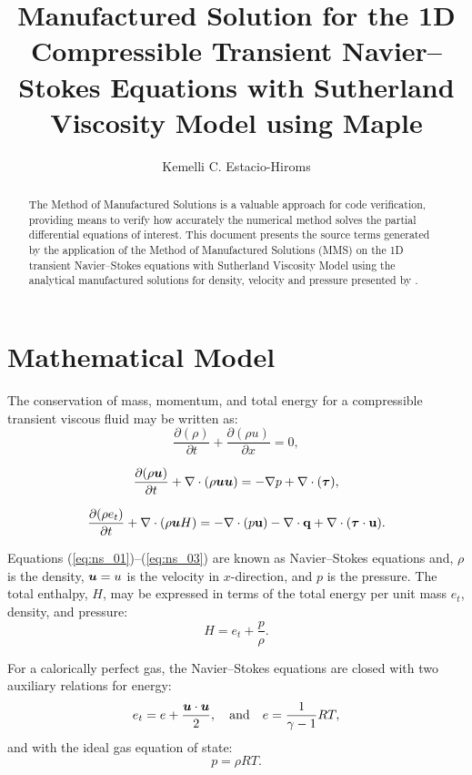 \documentclass[10pt]{article}
\title{Manufactured Solution for the 1D Compressible Transient Navier--Stokes Equations with Sutherland Viscosity Model using Maple\texttrademark}
\author{Kemelli C. Estacio-Hiroms}
\newcommand{\Diff}[2] {\dfrac{\partial( #1)}{\partial #2}}
\newcommand{\bv}[1]{\ensuremath{\mbox{\boldmath$ #1 $}}}
\begin{document}
\maketitle

\begin{abstract}
The Method of Manufactured Solutions is a valuable approach for code verification, providing means to verify how accurately the numerical method solves the partial differential equations of interest.
This document presents the source terms generated by the application of the Method of Manufactured Solutions (MMS) on the 1D transient Navier--Stokes equations  with Sutherland Viscosity Model using the analytical manufactured solutions for density, velocity and pressure presented by \citet{Roy2002}.
\end{abstract}





\section{Mathematical Model}
The conservation of mass, momentum, and total energy for a compressible transient viscous fluid may be written as:
\begin{equation}
 \label{eq:ns_01}
\Diff{\rho}{t} + \Diff{\rho u}{x} = 0,
\end{equation}

\begin{equation}
 \label{eq:ns_02}
\Diff{\rho \bv{u}}{t} +\nabla\cdot\left(\rho\bv{u}\bv{u}\right) = -\nabla p+  \nabla \cdot (\bv{\tau} ),
\end{equation}

\begin{equation}
 \label{eq:ns_03}
\Diff{\rho e_t}{t} +\nabla\cdot\left(\rho \bv{u} H\right) =-   \nabla\cdot(p  \mathbf{u}) -\nabla\cdot \mathbf{q} +  \nabla \cdot (\bv{\tau} \cdot \mathbf{u}).
\end{equation}


Equations (\ref{eq:ns_01})--(\ref{eq:ns_03}) are known as Navier--Stokes equations and, $\rho$ is the density, $\bv{u}=u$ is the velocity in $x$-direction,    and $p$ is the pressure. The total enthalpy, $H$, may be expressed in terms of the total energy per unit mass $e_t$, density, and pressure:
$$H = e_t + \dfrac{p}{\rho}.$$

For a calorically perfect gas, the Navier--Stokes equations are closed with two auxiliary relations for energy:
\begin{equation}
 \label{eq:ns_04}
e_t= e+\dfrac{\bv{u}\cdot \bv{u}}{2},\quad\mbox{and}\quad e=\dfrac{1}{\gamma -1}RT ,
\end{equation}
and with the ideal gas equation of state:
\begin{equation}
 \label{eq:ns_05}
p=\rho RT.
\end{equation}
\end{document}
